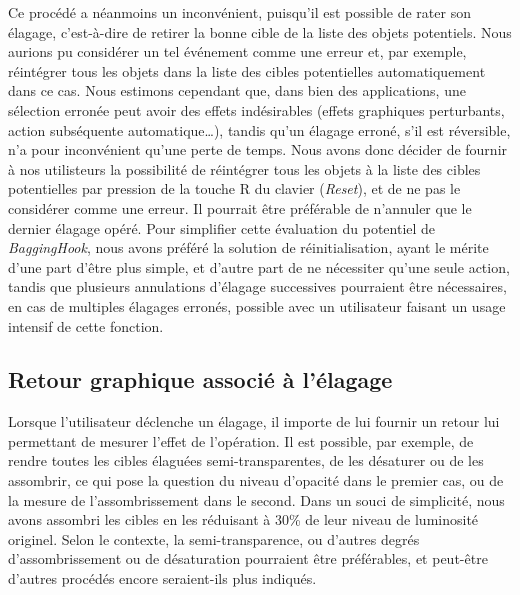 	Ce procédé a néanmoins un inconvénient, puisqu'il est possible de \og rater \fg{} son élagage, c'est-à-dire de retirer la bonne cible de la liste des objets potentiels. Nous aurions pu considérer un tel événement comme une erreur et, par exemple, réintégrer tous les objets dans la liste des cibles potentielles automatiquement dans ce cas. Nous estimons cependant que, dans bien des applications, une sélection erronée peut avoir des effets indésirables (effets graphiques perturbants, action subséquente automatique\ldots{}), tandis qu'un élagage erroné, s'il est réversible, n'a pour inconvénient qu'une perte de temps. Nous avons donc décider de fournir à nos utilisteurs la possibilité de réintégrer tous les objets à la liste des cibles potentielles par pression de la touche R du clavier (\emph{Reset}), et de ne pas le considérer comme une erreur. Il pourrait être préférable de n'annuler que le dernier élagage opéré. Pour simplifier cette évaluation du potentiel de \emph{BaggingHook}, nous avons préféré la solution de réinitialisation, ayant le mérite d'une part d'être plus simple, et d'autre part de ne nécessiter qu'une seule action, tandis que plusieurs annulations d'élagage successives pourraient être nécessaires, en cas de multiples élagages erronés, possible avec un utilisateur faisant un usage intensif de cette fonction.
	
	
	\subsection{Retour graphique associé à l'élagage}
	Lorsque l'utilisateur déclenche un élagage, il importe de lui fournir un retour lui permettant de mesurer l'effet de l'opération. Il est possible, par exemple, de rendre toutes les cibles élaguées semi-transparentes, de les désaturer ou de les assombrir, ce qui pose la question du niveau d'opacité dans le premier cas, ou de la mesure de l'assombrissement dans le second. Dans un souci de simplicité, nous avons assombri les cibles en les réduisant à 30\%{} de leur niveau de luminosité originel. Selon le contexte, la semi-transparence, ou d'autres degrés d'assombrissement ou de désaturation pourraient être préférables, et peut-être d'autres procédés encore seraient-ils plus indiqués.
	
